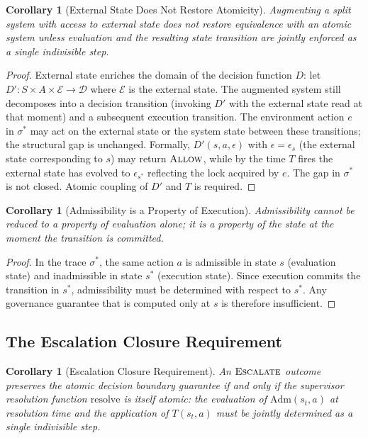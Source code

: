 \documentclass[11pt]{article}
\theoremstyle{plain}
\newtheorem{corollary}[theorem]{Corollary}
\theoremstyle{definition}
\theoremstyle{remark}
\newcommand{\Allow}{\textsc{Allow}}
\newcommand{\Escalate}{\textsc{Escalate}}
\newcommand{\Dset}{\mathcal{D}}
\newcommand{\Adm}{\mathrm{Adm}}
\begin{document}
\begin{corollary}[External State Does Not Restore Atomicity]
\label{cor:extstate}
Augmenting a split system with access to external state does not restore
equivalence with an atomic system unless evaluation and the resulting
state transition are jointly enforced as a single indivisible step.
\end{corollary}

\begin{proof}
External state enriches the domain of the decision function $D$: let
$D' : S \times A \times \mathcal{E} \to \Dset$ where $\mathcal{E}$ is the
external state.  The augmented system still decomposes into a decision
transition (invoking $D'$ with the external state read at that moment) and a
subsequent execution transition.  The environment action $e$ in $\sigma^*$ may
act on the external state or the system state between these transitions; the
structural gap is unchanged.  Formally, $D'(s, a, \epsilon)$ with
$\epsilon = \epsilon_s$ (the external state corresponding to $s$) may return
$\Allow$, while by the time $T$ fires the external state has evolved to
$\epsilon_{s^*}$ reflecting the lock acquired by $e$.  The gap in
$\sigma^*$ is not closed.  Atomic coupling of $D'$ and $T$ is required.
\end{proof}

\begin{corollary}[Admissibility is a Property of Execution]
\label{cor:execprop}
Admissibility cannot be reduced to a property of evaluation alone; it is a
property of the state at the moment the transition is committed.
\end{corollary}

\begin{proof}
In the trace $\sigma^*$, the same action $a$ is admissible in state $s$
(evaluation state) and inadmissible in state $s^*$ (execution state).  Since
execution commits the transition in $s^*$, admissibility must be determined
with respect to $s^*$.  Any governance guarantee that is computed only at
$s$ is therefore insufficient.
\end{proof}

\subsection{The Escalation Closure Requirement}

\begin{corollary}[Escalation Closure Requirement]
\label{cor:escalate}
An $\Escalate$ outcome preserves the atomic decision boundary guarantee if
and only if the supervisor resolution function $\mathrm{resolve}$ is itself
atomic: the evaluation of $\Adm(s_t, a)$ at resolution time and the
application of $T(s_t, a)$ must be jointly determined as a single indivisible
step.
\end{corollary}
\end{document}

